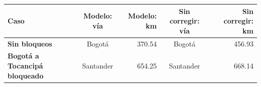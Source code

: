 \renewcommand{\arraystretch}{1.2}
\begin{tabular}{|l|c|r|c|r|}
\hline
\rowcolor{gray!20} \textbf{Caso} & \textbf{Modelo: vía} & \textbf{Modelo: km} & \textbf{Sin corregir: vía} & \textbf{Sin corregir: km} \\
\hline
\textbf{Sin bloqueos} & Bogotá & 370.54 & Bogotá & 456.93 \\
\hline
\textbf{Bogotá a Tocancipá bloqueado} & Santander & 654.25 & Santander & 668.14 \\
\hline
\end{tabular}
